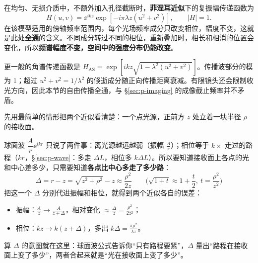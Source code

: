 \begin{idea}[全通为什么还会出现衍射图样]
在均匀、无损介质中，不额外加入孔径截断时，\textbf{菲涅耳近似}下的复振幅传递函数为
\[
H(u,v)=\ee^{ikz}\exp[-i\pi\lambda z(u^2+v^2)],\qquad |H|=1.
\]
在该模型适用的傍轴频率范围内，每个光场频率成分只改变相位，幅度不变，这就是此处\textbf{全通}的含义。不同成分转过不同的相位，重新叠加时，相长和相消的位置会变化，所以\textbf{频谱幅度不变，空间中的强度分布仍能改变}。

更一般的角谱传递函数是 $H_{\mathrm{AS}}=\exp[ikz\sqrt{1-\lambda^2(u^2+v^2)}]$。传播波部分的模为 1；超过 $u^2+v^2=1/\lambda^2$ 的倏逝成分随正向传播距离衰减。有限镜头还会限制收光方向，因此本节的自由传播全通，与 §\ref{sec:p-imaging} 的成像截止频率并不矛盾。
\end{idea}

先用最简单的情形把两个近似看清楚：一个点光源，正前方 $z$ 处立着一块半径 $\rho$ 的接收面。

球面波 $\dfrac{A}{r}\ee^{ikr}$ 只说了两件事：离光源越远越弱（振幅 $\frac Ar$）；相位等于 $k\times$ 走过的路程（$kr$，§\ref{sec:p-wave}：多走 $\Delta L$，相位多 $k\Delta L$）。所以要知道接收面上各点的光和中心差多少，只需要知道\textbf{各点比中心多走了多少路}：
\[
\Delta=r-z=\sqrt{z^2+\rho^2}-z\approx\frac{\rho^2}{2z}\qquad\Big(\sqrt{1+t}\approx1+\frac t2,\ t=\frac{\rho^2}{z^2}\Big)
\]
把这一个 $\Delta$ 分别代进振幅和相位，就得到两个近似各自的误差：
\begin{itemize}
\item 振幅：$\frac{A}{z}\to\frac{A}{z+\Delta}$，相对变化 $\approx\frac{\Delta}{z}=\frac{\rho^2}{2z^2}$；
\item 相位：$kz\to k(z+\Delta)$，多出 $k\Delta=\frac{\pi\rho^2}{\lambda z}$。
\end{itemize}
算 $\Delta$ 的意图就在这里：球面波公式告诉你“只有路程要紧”，$\Delta$ 量出“路程在接收面上变了多少”，两者合起来就是“光在接收面上变了多少”。


\begin{center}
\end{center}

